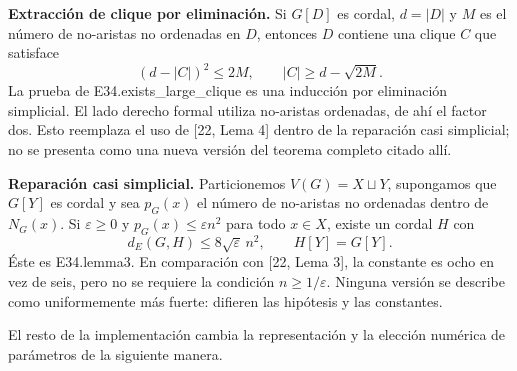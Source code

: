 \documentclass[spanish,11pt,a4paper]{article}
\begin{document}
\textbf{Extracción de clique por eliminación.} Si \(G[D]\) es cordal, \(d=|D|\) y \(M\) es el número de no-aristas no ordenadas en \(D\), entonces \(D\) contiene una clique \(C\) que satisface \[
(d-|C|)^2\le2M,\qquad |C|\ge d-\sqrt{2M}.
\tag{F.9}
\] La prueba de {\ttfamily\small E34.\discretionary{\hbox{\ensuremath{\hookrightarrow}}}{}{}exists\_\discretionary{\hbox{\ensuremath{\hookrightarrow}}}{}{}large\_\discretionary{\hbox{\ensuremath{\hookrightarrow}}}{}{}clique} es una inducción por eliminación simplicial. El lado derecho formal utiliza no-aristas ordenadas, de ahí el factor dos. Esto reemplaza el uso de {[}22, Lema 4{]} dentro de la reparación casi simplicial; no se presenta como una nueva versión del teorema completo citado allí.

\textbf{Reparación casi simplicial.} Particionemos \(V(G)=X\sqcup Y\), supongamos que \(G[Y]\) es cordal y sea \(p_G(x)\) el número de no-aristas no ordenadas dentro de \(N_G(x)\). Si \(\varepsilon\ge0\) y \(p_G(x)\le\varepsilon n^2\) para todo \(x\in X\), existe un cordal \(H\) con \[
d_E(G,H)\le8\sqrt{\varepsilon}\,n^2,\qquad H[Y]=G[Y].
\tag{F.10}
\] Éste es E34.lemma3. En comparación con {[}22, Lema 3{]}, la constante es ocho en vez de seis, pero no se requiere la condición \(n\ge1/\varepsilon\). Ninguna versión se describe como uniformemente más fuerte: difieren las hipótesis y las constantes.

El resto de la implementación cambia la representación y la elección numérica de parámetros de la siguiente manera.

\end{document}
